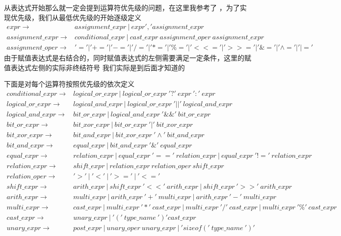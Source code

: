 \documentclass[UTF8]{ctexart}
\begin{document}
从表达式开始那么就一定会提到运算符优先级的问题，在这里我参考了\cite{C operator list}
，为了实现优先级，我们从最低优先级的开始逐级定义
\begin{align*}
    expr\to &assignment\_expr\ |\ expr','assignment\_expr\\
    assignment\_expr\to &conditional\_expr\ |\ cast\_expr\ assignment\_oper\ assignment\_expr\\
    assignment\_oper\to &'='|'+='|'-='|'/='|'*='|'\%='|'<<='|'>>='|'\&='|'\wedge='|'|=' 
\end{align*}
由于赋值表达式是右结合的，同时赋值表达式的左侧需要满足一定条件，这里的赋值表达式左侧的实际非终结符号
我们实际是到后面才知道的

下面是对每个运算符按照优先级的依次定义
\begin{align*}
    conditional\_expr\to & logical\_or\_expr\ |\ logical\_or\_expr\ '?'\ expr\ ':'\ expr\\
    logical\_or\_expr\to & logical\_and\_expr\ |\ logical\_or\_expr\ '||'\ logical\_and\_expr\\
    logical\_and\_expr\to & bit\_or\_expr\ |\ logical\_and\_expr\ '\&\&'\ bit\_or\_expr\\
    bit\_or\_expr\to & bit\_xor\_expr\ |\ bit\_or\_expr\ '|'\ bit\_xor\_expr\\
    bit\_xor\_expr\to & bit\_and\_expr\ |\ bit\_xor\_expr\ '\wedge'\ bit\_and\_expr\\
    bit\_and\_expr\to & equal\_expr\ |\ bit\_and\_expr\ '\&'\ equal\_expr\\
    equal\_expr\to & relation\_expr\ |\ equal\_expr\ '=='\ relation\_expr\ |\ equal\_expr\ '!='\ relation\_expr\\
    relation\_expr\to & shift\_expr\ |\ relation\_expr\ relation\_oper\ shift\_expr\\
    relation\_oper\to & '>'\ |\ '<'\ |\ '>='\ |\ '<='\\
    shift\_expr\to & arith\_expr\ |\ shift\_expr\ '<<'\ arith\_expr\ |\ shift\_expr\ '>>'\ arith\_expr\\
    arith\_expr\to & multi\_expr\ |\ arith\_expr\ '+'\ multi\_expr\ |\ arith\_expr\ '-'\ multi\_expr\\
    multi\_expr\to & cast\_expr\ |\ multi\_expr\ '*'\ cast\_expr\ |\ multi\_expr\ '/'\ cast\_expr\ |\ multi\_expr\ '\%'\ cast\_expr\\
    cast\_expr\to & unary\_expr\ |\ '('\ type\_name\ ')' cast\_expr\\
    unary\_expr\to & post\_expr\ |\ unary\_oper\ unary\_expr\ |\ 'sizeof('\ type\_name\ ')'\\

\end{align*}
\end{document}
